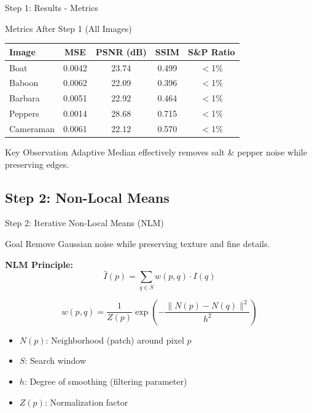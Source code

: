 \documentclass[aspectratio=169]{beamer}
\begin{document}
\begin{frame}{Step 1: Results - Metrics}
    \begin{block}{Metrics After Step 1 (All Images)}
        \begin{table}
            \centering
            \begin{tabular}{lcccc}
                \toprule
                \textbf{Image} & \textbf{MSE} & \textbf{PSNR (dB)} & \textbf{SSIM} & \textbf{S\&P Ratio} \\
                \midrule
                Boat & 0.0042 & 23.74 & 0.499 & $<$1\% \\
                Baboon & 0.0062 & 22.09 & 0.396 & $<$1\% \\
                Barbara & 0.0051 & 22.92 & 0.464 & $<$1\% \\
                Peppers & 0.0014 & 28.68 & 0.715 & $<$1\% \\
                Cameraman & 0.0061 & 22.12 & 0.570 & $<$1\% \\
                \bottomrule
            \end{tabular}
        \end{table}
    \end{block}
    
    \begin{alertblock}{Key Observation}
        Adaptive Median effectively removes salt \& pepper noise while preserving edges.
    \end{alertblock}
\end{frame}

\subsection{Step 2: Non-Local Means}

\begin{frame}{Step 2: Iterative Non-Local Means (NLM)}
    \begin{block}{Goal}
        Remove Gaussian noise while preserving texture and fine details.
    \end{block}
    
    \textbf{NLM Principle:}
    \begin{equation}
        \hat{I}(p) = \sum_{q \in S} w(p,q) \cdot I(q)
    \end{equation}
    
    \begin{equation}
        w(p,q) = \frac{1}{Z(p)} \exp\left(-\frac{\|N(p) - N(q)\|^2}{h^2}\right)
    \end{equation}
    
    \begin{itemize}
        \item $N(p)$: Neighborhood (patch) around pixel $p$
        \item $S$: Search window
        \item $h$: Degree of smoothing (filtering parameter)
        \item $Z(p)$: Normalization factor
    \end{itemize}
\end{frame}
\end{document}
